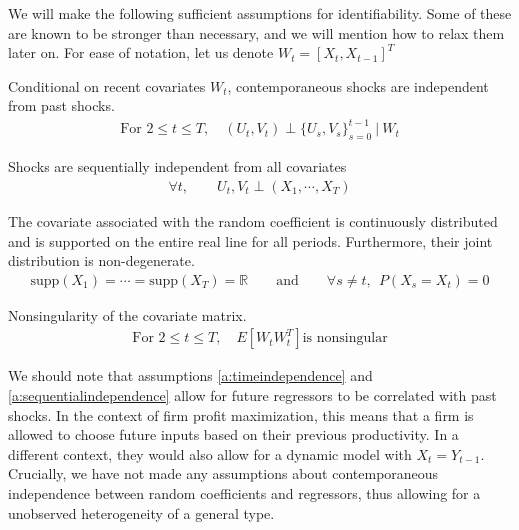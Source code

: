 We will make the following sufficient assumptions for identifiability. Some of these are known to be stronger than necessary, and we will mention how to relax them later on. For ease of notation, let us denote $W_t = [X_t, X_{t-1}]^{T}$

\begin{assumption}{} \label{a:timeindependence}
  Conditional on recent covariates $W_t$, contemporaneous shocks are independent from past shocks.
  \begin{align}
    \text{For }2 \leq t \leq T ,
    \quad     
    (U_t, V_t) \perp \{ U_s, V_s \}_{s=0}^{t-1} \  | \ W_t
  \end{align}
\end{assumption}


\begin{assumption}{} \label{a:sequentialindependence}
  Shocks are sequentially independent from all covariates
  \begin{align}
    \forall t, \qquad U_t, V_t \perp (X_{1}, \cdots, X_{T})
  \end{align}
\end{assumption}


\begin{assumption}{}  \label{a:support}
  The covariate associated with the random coefficient is continuously distributed and is supported on the entire real line for all periods. Furthermore, their joint distribution is non-degenerate.
  \begin{align}
    \text{supp}(X_1) = \cdots = \text{supp}(X_T) = \mathbb{R} \qquad \text{and} \qquad \forall s \neq t, \ \ P(X_s = X_t) = 0 
  \end{align}
\end{assumption}

\begin{assumption}{}  \label{a:fullrank}
  Nonsingularity of the covariate matrix.
  \begin{align}
    \text{For }2 \leq t \leq T ,
    \quad     
    E[W_tW_t^{T}] \text{is nonsingular}
  \end{align}
\end{assumption}


We should note that assumptions \ref{a:timeindependence} and \ref{a:sequentialindependence} allow for future regressors to be correlated with past shocks. In the context of firm profit maximization, this means that a firm is allowed to choose future inputs based on their previous productivity. In a different context, they would also allow for a dynamic model with $X_t = Y_{t-1}$. Crucially, we have not made any assumptions about contemporaneous independence between random coefficients and regressors, thus allowing for a unobserved heterogeneity of a general type.

